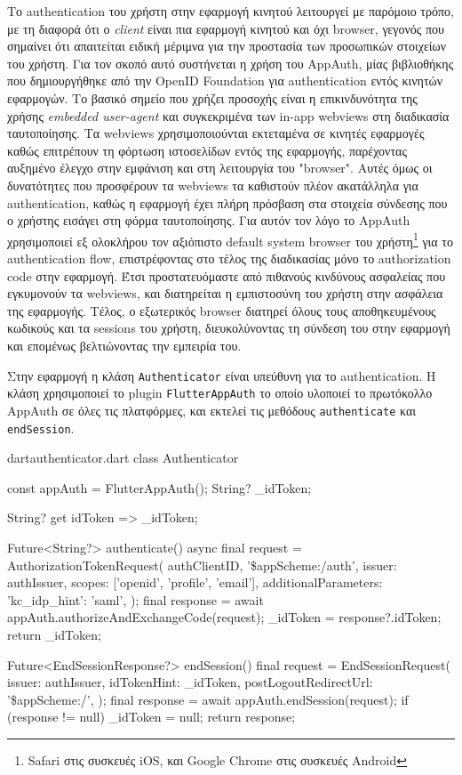 \documentclass[../thesis.tex]{subfiles}
\begin{document}
Το authentication του χρήστη στην εφαρμογή κινητού λειτουργεί με παρόμοιο τρόπο, με τη διαφορά ότι ο \textit{client} είναι πια εφαρμογή κινητού και όχι browser, γεγονός που σημαίνει ότι απαιτείται ειδική μέριμνα για την προστασία των προσωπικών στοιχείων του χρήστη.
Για τον σκοπό αυτό συστήνεται η χρήση του AppAuth, μίας βιβλιοθήκης που δημιουργήθηκε από την OpenID Foundation για authentication εντός κινητών εφαρμογών.
Το βασικό σημείο που χρήζει προσοχής είναι η επικινδυνότητα της χρήσης \textit{embedded user-agent} και συγκεκριμένα των in-app webviews στη διαδικασία ταυτοποίησης.
Τα webviews χρησιμοποιούνται εκτεταμένα σε κινητές εφαρμογές καθώς επιτρέπουν τη φόρτωση ιστοσελίδων εντός της εφαρμογής, παρέχοντας αυξημένο έλεγχο στην εμφάνιση και στη λειτουργία του "browser".
Αυτές όμως οι δυνατότητες που προσφέρουν τα webviews τα καθιστούν πλέον ακατάλληλα για authentication, καθώς η εφαρμογή έχει πλήρη πρόσβαση στα στοιχεία σύνδεσης που ο χρήστης εισάγει στη φόρμα ταυτοποίησης.\cite[\S8.12]{rfc8252}
Για αυτόν τον λόγο το AppAuth χρησιμοποιεί εξ ολοκλήρου τον αξιόπιστο default system browser του χρήστη\footnote{Safari στις συσκευές iOS, και Google Chrome στις συσκευές Android} για το authentication flow, επιστρέφοντας στο τέλος της διαδικασίας μόνο το authorization code στην εφαρμογή.
Έτσι προστατευόμαστε από πιθανούς κινδύνους ασφαλείας που εγκυμονούν τα webviews, και διατηρείται η εμπιστοσύνη του χρήστη στην ασφάλεια της εφαρμογής.
Τέλος, ο εξωτερικός browser διατηρεί όλους τους αποθηκευμένους κωδικούς και τα sessions του χρήστη, διευκολύνοντας τη σύνδεση του στην εφαρμογή και επομένως βελτιώνοντας την εμπειρία του.

Στην εφαρμογή η κλάση \verb|Authenticator| είναι υπεύθυνη για το authentication.
Η κλάση χρησιμοποιεί το plugin \verb|FlutterAppAuth| το οποίο υλοποιεί το πρωτόκολλο AppAuth σε όλες τις πλατφόρμες, και εκτελεί τις μεθόδους \verb|authenticate| και \verb|endSession|.

\begin{codeblock}{dart}{authenticator.dart}
  class Authenticator {
    const appAuth = FlutterAppAuth();
    String? _idToken;

    String? get idToken => _idToken;
  
    Future<String?> authenticate() async {
      final request = AuthorizationTokenRequest(
        authClientID,
        '\$appScheme:/auth',
        issuer: authIssuer,
        scopes: ['openid', 'profile', 'email'],
        additionalParameters: {'kc_idp_hint': 'saml'},
      );
      final response = await appAuth.authorizeAndExchangeCode(request);
      _idToken = response?.idToken;
      return _idToken;
    }
  
    Future<EndSessionResponse?> endSession() {
      final request = EndSessionRequest(
        issuer: authIssuer,
        idTokenHint: _idToken,
        postLogoutRedirectUrl: '\$appScheme:/',
      );
      final response = await appAuth.endSession(request);
      if (response != null) _idToken = null;
      return response;
    }
  }  
\end{codeblock}
\end{document}
